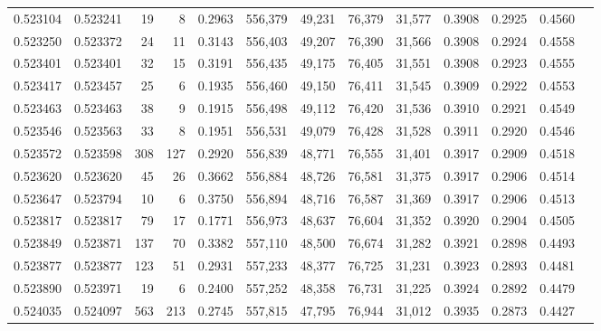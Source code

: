 \begin{tabular}{rrrrrrrrrrrrr}
0.523104 & 0.523241 &    19 &     8 &                                     0.2963 & 556,379 &  49,231 &  76,379 &  31,577 & 0.3908 & 0.2925 & 0.4560 \\
0.523250 & 0.523372 &    24 &    11 &                                     0.3143 & 556,403 &  49,207 &  76,390 &  31,566 & 0.3908 & 0.2924 & 0.4558 \\
0.523401 & 0.523401 &    32 &    15 &                                     0.3191 & 556,435 &  49,175 &  76,405 &  31,551 & 0.3908 & 0.2923 & 0.4555 \\
0.523417 & 0.523457 &    25 &     6 &                                     0.1935 & 556,460 &  49,150 &  76,411 &  31,545 & 0.3909 & 0.2922 & 0.4553 \\
0.523463 & 0.523463 &    38 &     9 &                                     0.1915 & 556,498 &  49,112 &  76,420 &  31,536 & 0.3910 & 0.2921 & 0.4549 \\
0.523546 & 0.523563 &    33 &     8 &                                     0.1951 & 556,531 &  49,079 &  76,428 &  31,528 & 0.3911 & 0.2920 & 0.4546 \\
0.523572 & 0.523598 &   308 &   127 &                                     0.2920 & 556,839 &  48,771 &  76,555 &  31,401 & 0.3917 & 0.2909 & 0.4518 \\
0.523620 & 0.523620 &    45 &    26 &                                     0.3662 & 556,884 &  48,726 &  76,581 &  31,375 & 0.3917 & 0.2906 & 0.4514 \\
0.523647 & 0.523794 &    10 &     6 &                                     0.3750 & 556,894 &  48,716 &  76,587 &  31,369 & 0.3917 & 0.2906 & 0.4513 \\
0.523817 & 0.523817 &    79 &    17 &                                     0.1771 & 556,973 &  48,637 &  76,604 &  31,352 & 0.3920 & 0.2904 & 0.4505 \\
0.523849 & 0.523871 &   137 &    70 &                                     0.3382 & 557,110 &  48,500 &  76,674 &  31,282 & 0.3921 & 0.2898 & 0.4493 \\
0.523877 & 0.523877 &   123 &    51 &                                     0.2931 & 557,233 &  48,377 &  76,725 &  31,231 & 0.3923 & 0.2893 & 0.4481 \\
0.523890 & 0.523971 &    19 &     6 &                                     0.2400 & 557,252 &  48,358 &  76,731 &  31,225 & 0.3924 & 0.2892 & 0.4479 \\
0.524035 & 0.524097 &   563 &   213 &                                     0.2745 & 557,815 &  47,795 &  76,944 &  31,012 & 0.3935 & 0.2873 & 0.4427 \\

\end{tabular}
